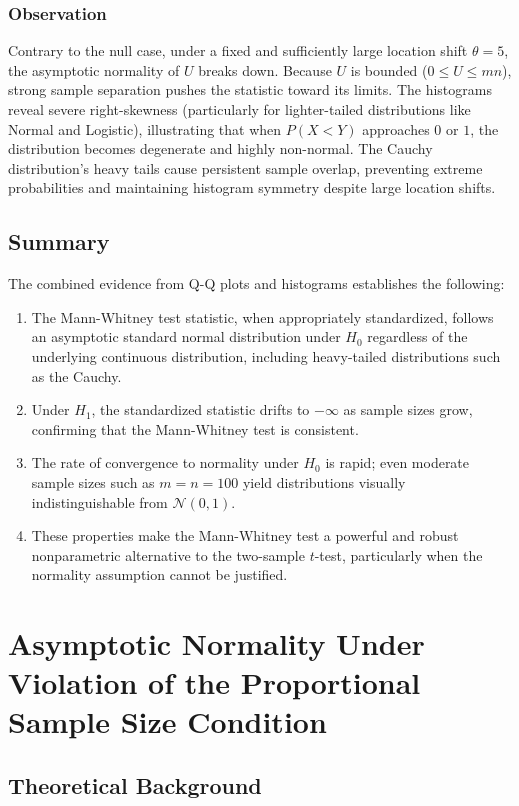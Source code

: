 \documentclass[10pt]{article}
\begin{document}
\subsubsection{Observation}
    Contrary to the null case, under a fixed and sufficiently large location shift $\theta = 5$, the asymptotic normality of $U$ breaks down. Because $U$ is bounded ($0 \leq U \leq mn$), strong sample separation pushes the statistic toward its limits. The histograms reveal severe right-skewness (particularly for lighter-tailed distributions like Normal and Logistic), illustrating that when $P(X < Y)$ approaches $0$ or $1$, the distribution becomes degenerate and highly non-normal. The Cauchy distribution’s heavy tails cause persistent sample overlap, preventing extreme probabilities and maintaining histogram symmetry despite large location shifts.

\subsection{Summary}

The combined evidence from Q-Q plots and histograms establishes the following:
\begin{enumerate}
    \item The Mann-Whitney test statistic, when appropriately standardized, follows an asymptotic standard normal distribution under $H_0$ regardless of the underlying continuous distribution, including heavy-tailed distributions such as the Cauchy.
    \item Under $H_1$, the standardized statistic drifts to $-\infty$ as sample sizes grow, confirming that the Mann-Whitney test is consistent.
    \item The rate of convergence to normality under $H_0$ is rapid; even moderate sample sizes such as $m = n = 100$ yield distributions visually indistinguishable from $\mathcal{N}(0,1)$.
    \item These properties make the Mann-Whitney test a powerful and robust nonparametric alternative to the two-sample $t$-test, particularly when the normality assumption cannot be justified.
\end{enumerate}

\section{Asymptotic Normality Under Violation of the Proportional Sample Size Condition}

\subsection{Theoretical Background}
\end{document}
